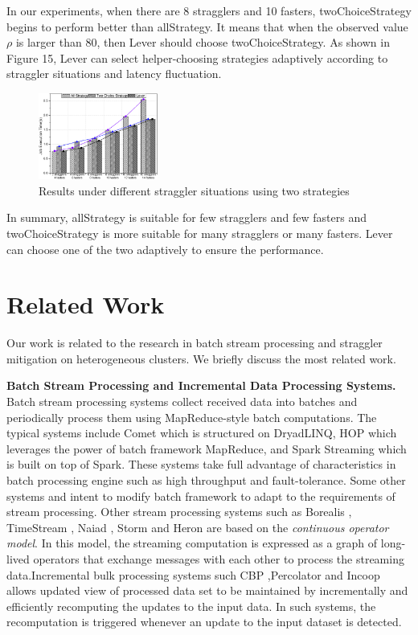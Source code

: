 \documentclass[10pt,conference,compsocconf,letterpaper]{IEEEtran}
\begin{document}
  In our experiments, when there are 8 stragglers and 10 fasters, twoChoiceStrategy begins to perform better than allStrategy. It means that when the observed value $\rho$ is larger than 80, then Lever should choose twoChoiceStrategy. As shown in Figure 15, Lever can select helper-choosing strategies adaptively according to straggler situations and latency fluctuation.
  \begin{figure}[htbp]
    \centering
    \includegraphics[width=0.35\textwidth]{FigureAllorTwo}
    \caption{Results under different straggler situations using two strategies}
    \label{Fig. 15:}
  \end{figure}

  In summary, allStrategy is suitable for few stragglers and few fasters and twoChoiceStrategy is more suitable for many stragglers or many fasters. Lever can choose one of the two adaptively to ensure the performance.

\section{Related Work}

  Our work is related to the research in batch stream processing and straggler mitigation on heterogeneous clusters. We briefly discuss the most related work.

  \textbf{Batch Stream Processing and Incremental Data Processing Systems.} Batch stream processing systems collect received data into batches and periodically process them using MapReduce-style batch computations. The typical systems include Comet \cite{He2010} which is structured on DryadLINQ, HOP \cite{Condie2010} which leverages the power of batch framework MapReduce, and Spark Streaming \cite{Zaharia2013} which is built on top of Spark. These systems take full advantage of characteristics in batch processing engine such as high throughput and fault-tolerance. Some other systems \cite{Li2011} and \cite{Lam2012} intent to modify batch framework to adapt to the requirements of stream processing. Other stream processing systems such as Borealis \cite{Abadi2005}, TimeStream \cite{Qian2013}, Naiad \cite{Murray2013}, Storm \cite{Toshniwal2014} and Heron \cite{Kulkarni2015} are based on the \emph{continuous operator model}. In this model, the streaming computation is expressed as a graph of long-lived operators that exchange messages with each other to process the streaming data.Incremental bulk processing systems such CBP \cite{Logothetis2010},Percolator \cite{Peng2010} and Incoop \cite{Bhatotia2011a} allows updated view of processed data set to be maintained by incrementally and efficiently recomputing the updates to the input data. In such systems, the recomputation is triggered whenever an update to the input dataset is detected.
\end{document}
